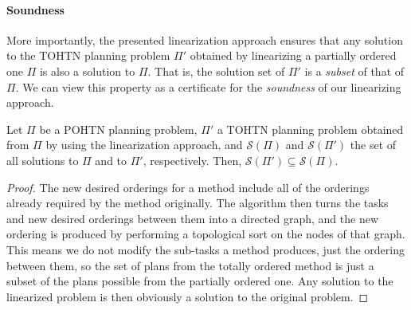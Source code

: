 




\paragraph{Soundness} More importantly, the presented linearization approach ensures that any solution to the TOHTN planning problem $\Pi'$ obtained by linearizing a partially ordered one $\Pi$ is also a solution to $\Pi$. That is, the solution set of $\Pi'$ is a \emph{subset} of that of $\Pi$. We can view this property as a certificate for the \emph{soundness} of our linearizing approach.

\begin{theorem}
	Let $\Pi$ be a POHTN planning problem, $\Pi'$ a TOHTN planning problem obtained from $\Pi$ by using the linearization approach, and $\mathcal{S}(\Pi)$ and $\mathcal{S}(\Pi')$ the set of all solutions to $\Pi$ and to $\Pi'$, respectively. Then, $\mathcal{S}(\Pi') \subseteq \mathcal{S}(\Pi)$. 
	\label{thm:Soundness}
\end{theorem}

\begin{proof}
	The new desired orderings for a method include all of the orderings already required by the method originally. The algorithm then turns the tasks and new desired orderings between them into a directed graph, and the new ordering is produced by performing a topological sort on the nodes of that graph. This means we do not modify the sub-tasks a method produces, just the ordering between them, so the set of plans from the totally ordered method is just a subset of the plans possible from the partially ordered one. Any solution to the linearized problem is then obviously a solution to the original problem.
\end{proof}

